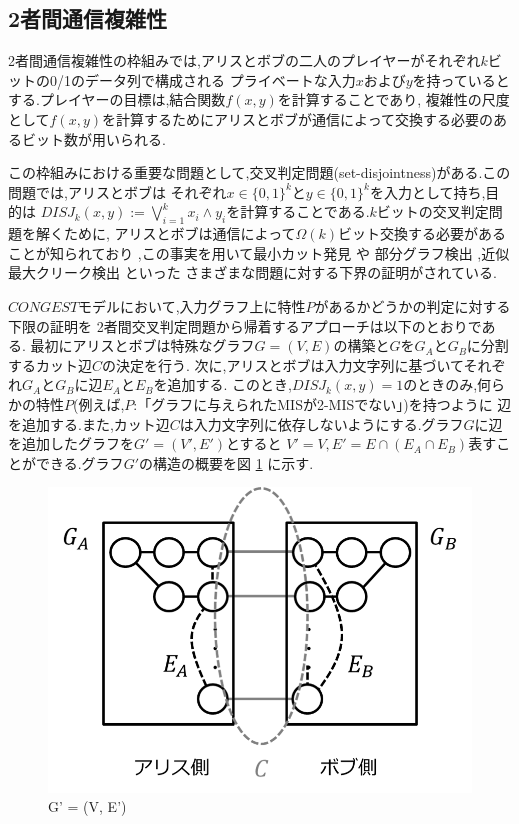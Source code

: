 \documentclass[12pt]{thesis}
\theoremstyle{definition}
\begin{document}
\subsection*{2者間通信複雑性}
2者間通信複雑性の枠組みでは,アリスとボブの二人のプレイヤーがそれぞれ$k$ビットの0/1のデータ列で構成される
プライベートな入力$x$および$y$を持っているとする.プレイヤーの目標は,結合関数$f(x, y)$を計算することであり,
複雑性の尺度として$f(x, y)$を計算するためにアリスとボブが通信によって交換する必要のあるビット数が用いられる.

この枠組みにおける重要な問題として,交叉判定問題(set-disjointness)がある.この問題では,アリスとボブは
それぞれ$x \in \{0, 1\}^{k}$と$y \in \{0, 1\}^{k}$を入力として持ち,目的は
$DISJ_{k} (x, y) :=\bigvee_{i = 1}^{k} x_{i} \land y_{i}$を計算することである.$k$ビットの交叉判定問題を解くために,
アリスとボブは通信によって$\Omega (k)$ビット交換する必要があることが知られており 
\cite{kalyanasundaram1992probabilistic},この事実を用いて最小カット発見 \cite{ghaffari2013distributed} や
部分グラフ検出 \cite{fischer2018possibilities} ,近似最大クリーク検出 \cite{czumaj2020detecting} といった
さまざまな問題に対する下界の証明がされている.

$CONGEST$モデルにおいて,入力グラフ上に特性$P$があるかどうかの判定に対する下限の証明を
2者間交叉判定問題から帰着するアプローチは以下のとおりである.
最初にアリスとボブは特殊なグラフ$G = (V, E)$の構築と$G$を$G_{A}$と$G_{B}$に分割するカット辺$C$の決定を行う.
次に,アリスとボブは入力文字列に基づいてそれぞれ$G_{A}$と$G_{B}$に辺$E_{A}$と$E_{B}$を追加する.
このとき,$DISJ_{k} (x, y)=1$のときのみ,何らかの特性$P$(例えば,$P$:「グラフに与えられたMISが2-MISでない」)を持つように
辺を追加する.また,カット辺$C$は入力文字列に依存しないようにする.グラフ$G$に辺を追加したグラフを$G' = (V', E')$とすると
$V' = V, E' = E \cap (E_{A} \cap E_{B})$表すことができる.グラフ$G'$の構造の概要を図 \ref{Dif_Gx} に示す.

\begin{figure}[ht]
\begin{center}
\includegraphics[width=120mm]{Dif_Gx.png}
\end{center}
\caption{G' = (V, E')}
\label{Dif_Gx}
\end{figure}
\end{document}
